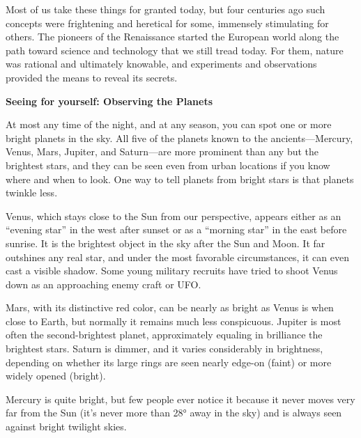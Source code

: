 \documentclass[main.tex]{subfiles}
\begin{document}
\vspace{1em}

Most of us take these things for granted today, but four centuries ago such concepts were frightening and heretical for some, immensely stimulating for others. The pioneers of the Renaissance started the European world along the path toward science and technology that we still tread today. For them, nature was rational and ultimately knowable, and experiments and observations provided the means to reveal its secrets.

\begin{mdframed}[backgroundcolor=black!10]
    \textbf{Seeing for yourself: Observing the Planets}

    \vspace{1ex}

    At most any time of the night, and at any season, you can spot one or more bright planets in the sky. All five of the planets known to the ancients---Mercury, Venus, Mars, Jupiter, and Saturn---are more prominent than any but the brightest stars, and they can be seen even from urban locations if you know where and when to look. One way to tell planets from bright stars is that planets twinkle less.

    \vspace{1em}

    Venus, which stays close to the Sun from our perspective, appears either as an ``evening star'' in the west after sunset or as a ``morning star'' in the east before sunrise. It is the brightest object in the sky after the Sun and Moon. It far outshines any real star, and under the most favorable circumstances, it can even cast a visible shadow. Some young military recruits have tried to shoot Venus down as an approaching enemy craft or UFO.

    \vspace{1em}
    
    Mars, with its distinctive red color, can be nearly as bright as Venus is when close to Earth, but normally it remains much less conspicuous. Jupiter is most often the second-brightest planet, approximately equaling in brilliance the brightest stars. Saturn is dimmer, and it varies considerably in brightness, depending on whether its large rings are seen nearly edge-on (faint) or more widely opened (bright).

    \vspace{1em}
    
    Mercury is quite bright, but few people ever notice it because it never moves very far from the Sun (it's never more than \ang{28} away in the sky) and is always seen against bright twilight skies.


\end{mdframed}
\end{document}

